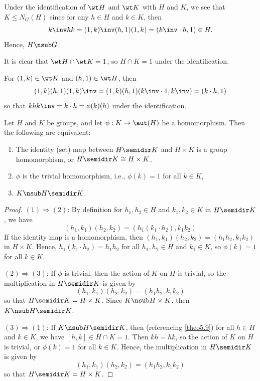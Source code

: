 \begin{proofnum}
    \item Under the identification of $\wt H$ and $\wt K$ with $H$ and $K$, we see that $K \leq N_G(H)$ since for any $h \in H$ and $k \in K$, then
    \[k\inv hk = (1, k)\inv (h, 1)(1, k) = (k\inv \cdot h, 1) \in H.\]
    Hence, $H \nsub G$.
    \item It is clear that $\wt H \cap \wt K = 1$, so $H \cap K = 1$ under the identification.
    \item For $(1, k) \in \wt K$ and $(h, 1) \in \wt H$, then
    \[(1, k)(h, 1)(1, k)\inv = (1, k)(h, 1)(k\inv \cdot 1, k\inv) = (k \cdot h, 1)\]
    so that $khk\inv = k \cdot h = \phi(k)(h)$ under the identification.
\end{proofnum}

\begin{prop}
    \label{prop5.11}
    Let $H$ and $K$ be groups, and let $\phi : K \to \aut(H)$ be a homomorphism. Then the following are equivalent:
    \begin{enumerate}
        \item The identity (set) map between $H \semidir K$ and $H \times K$ is a group homomorphism, or $H \semidir K \cong H \times K$.
        \item $\phi$ is the trivial homomorphism, i.e., $\phi(k) = 1$ for all $k \in K$,
        \item $K \nsub H \semidir K$.
    \end{enumerate}
\end{prop}

\begin{proof}
    \leavevmode\newline
    $(1) \Rightarrow (2)$: By definition for $h_1, h_2 \in H$ and $k_1, k_2 \in K$ in $H \semidir K$, we have
    \[(h_1, k_1)(h_2, k_2) = (h_1 (k_1 \cdot h_2), k_1 k_2)\]
    If the identity map is a homomorphism, then $(h_1, k_1)(h_2, k_2) = (h_1 h_2, k_1 k_2)$ in $H \times K$. Hence, $h_1 (k_1 \cdot h_2) = h_1 h_2$ for all $h_1, h_2 \in H$ and $k_1 \in K$, so $\phi(k) = 1$ for all $k \in K$.

    \noindent $(2) \Rightarrow (3)$: If $\phi$ is trivial, then the action of $K$ on $H$ is trivial, so the multiplication in $H \semidir K$ is given by
    \[(h_1, k_1)(h_2, k_2) = (h_1 h_2, k_1 k_2)\]
    so that $H \semidir K = H \times K$. Since $K \nsub H \times K$, then $K \nsub H \semidir K$.

    \noindent $(3) \Rightarrow (1)$: If $K \nsub H \semidir K$, then (referencing \autoref{theo5.9}) for all $h \in H$ and $k \in K$, we have $[h, k] \in H \cap K = 1$. Then $kh = hk$, so the action of $K$ on $H$ is trivial, or $\phi(k) = 1$ for all $k \in K$. Hence, the multiplication in $H \semidir K$ is given by
    \[(h_1, k_1)(h_2, k_2) = (h_1 h_2, k_1 k_2)\]
    so that $H \semidir K = H \times K$.
\end{proof}

